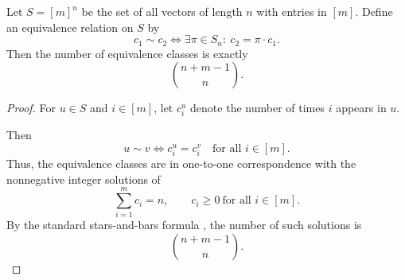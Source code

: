\begin{lemma}
\label{comb_proof}
Let $S=[m]^n$ be the set of all vectors of length $n$ with entries in $[m]$.
Define an equivalence relation on $S$ by
\[
c_1\sim c_2
\iff
\exists \pi\in S_n:\ c_2=\pi\cdot c_1.
\]
Then the number of equivalence classes is exactly
\[
\binom{n+m-1}{n}.
\]
\end{lemma}

\begin{proof}
For $u\in S$ and $i\in[m]$, let $c_i^u$ denote the number of times $i$ appears in $u$.

Then
\[
u\sim v
\iff
c_i^u=c_i^v
\quad\text{for all } i\in[m].
\]
Thus, the equivalence classes are in one-to-one correspondence with the nonnegative integer solutions of
\[
\sum_{i=1}^m c_i=n,
\qquad
c_i\geq 0 \ \text{for all } i\in[m].
\]
By the standard stars-and-bars formula \cite{stanley2011enumerative}, the number of such solutions is
\[
\binom{n+m-1}{n}.
\]
\end{proof}



